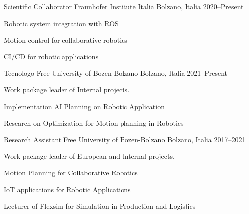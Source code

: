 \begin{cventries}
  \cventry%
    {Scientific Collaborator} %
    {Fraunhofer Institute Italia} %
    {Bolzano, Italia} %
    {2020--Present} %
    {%
      \begin{cvitems} 
        \item {Robotic system integration with ROS}
        \item {Motion control for collaborative robotics}
        \item {CI/CD for robotic applications}
      \end{cvitems}
    }

  \cventry%
    {Tecnologo} %
    {Free University of Bozen-Bolzano} %
    {Bolzano, Italia} %
    {2021--Present} %
    {%
      \begin{cvitems} %
        \item {Work package leader of Internal projects.}
        \item {Implementation AI Planning on Robotic Application}
        \item {Research on Optimization for Motion planning in Robotics}
      \end{cvitems}
    }
  \cventry%
    {Research Assistant} %
    {Free University of Bozen-Bolzano} %
    {Bolzano, Italia} %
    {2017--2021} %
    {%
      \begin{cvitems} %
        \item {Work package leader of European and Internal projects.}
        \item {Motion Planning for Collaborative Robotics}
        \item {IoT applications for Robotic Applications}
        \item {Lecturer of Flexsim for Simulation in Production and Logistics}
      \end{cvitems}
    }

\end{cventries}
